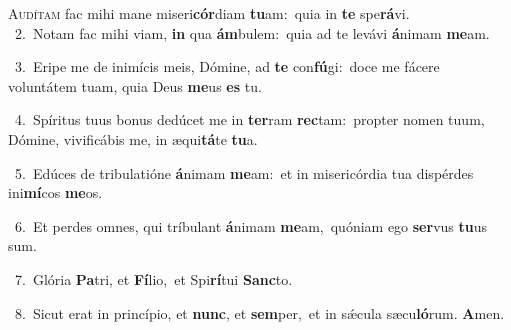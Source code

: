 \lettrine{\initial\textcolor{\initialcolor}{A}}{udítam} fac mihi mane miseri\-\textbf{cór}\-diam \textbf{tu}\-am:~\star quia in \textbf{te} spe\-\textbf{rá}\-vi.\\
{\numbfont\textcolor{\numbcolor}{~2.}}~Notam fac mihi viam, \textbf{in} qua \textbf{ám}\-bulem:~\star quia ad te levávi \textbf{á}\-nimam \textbf{me}\-am.\par
{\numbfont\textcolor{\numbcolor}{~3.}}~Eripe me de inimícis meis, Dómine, ad \textbf{te} con\-\textbf{fú}\-gi:~\star doce me fácere voluntátem tuam, quia Deus \textbf{me}\-us \textbf{es} tu.\par
{\numbfont\textcolor{\numbcolor}{~4.}}~Spíritus tuus bonus dedúcet me in \textbf{ter}\-ram \textbf{rec}\-tam:~\star propter nomen tuum, Dómine, vivificábis me, in æqui\-\textbf{tá}\-te \textbf{tu}\-a.\par
{\numbfont\textcolor{\numbcolor}{~5.}}~Edúces de tribulatióne \textbf{á}\-nimam \textbf{me}\-am:~\star et in misericórdia tua dispérdes ini\-\textbf{mí}\-cos \textbf{me}\-os.\par
{\numbfont\textcolor{\numbcolor}{~6.}}~Et perdes omnes, qui tríbulant \textbf{á}\-nimam \textbf{me}\-am,~\star quóniam ego \textbf{ser}\-vus \textbf{tu}\-us sum.\par
{\numbfont\textcolor{\numbcolor}{~7.}}~Glória \textbf{Pa}\-tri, et \textbf{Fí}\-lio,~\star et Spi\-\textbf{rí}\-tui \textbf{Sanc}\-to.\par
{\numbfont\textcolor{\numbcolor}{~8.}}~Sicut erat in princípio, et \textbf{nunc}\-, et \textbf{sem}\-per,~\star et in sǽcula sæcu\-\textbf{ló}\-rum. \textbf{A}\-men.\par
